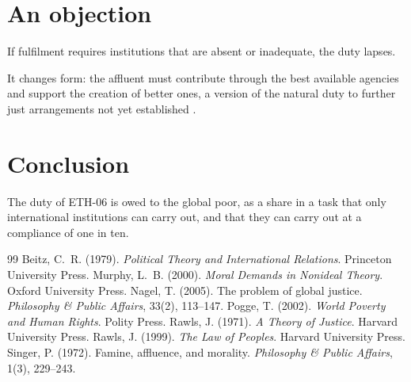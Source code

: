 \documentclass{situationist-preprint}
\begin{document}
\section{An objection}

\begin{objection}
If fulfilment requires institutions that are absent or inadequate, the duty lapses.
\end{objection}

\begin{reply}
It changes form: the affluent must contribute through the best available agencies and support the creation of better ones, a version of the natural duty to further just arrangements not yet established \citep[§19]{Rawls1971}.
\end{reply}


\section{Conclusion}

The duty of ETH-06 is owed to the global poor, as a share in a task that only international institutions can carry out, and that they can carry out at a compliance of one in ten.

\begin{thebibliography}{99}\small
{} Beitz, C.~R. (1979). \emph{Political Theory and International Relations}. Princeton University Press.
 Murphy, L.~B. (2000). \emph{Moral Demands in Nonideal Theory}. Oxford University Press.
 Nagel, T. (2005). The problem of global justice. \emph{Philosophy \& Public Affairs}, 33(2), 113--147.
 Pogge, T. (2002). \emph{World Poverty and Human Rights}. Polity Press.
 Rawls, J. (1971). \emph{A Theory of Justice}. Harvard University Press.
 Rawls, J. (1999). \emph{The Law of Peoples}. Harvard University Press.
 Singer, P. (1972). Famine, affluence, and morality. \emph{Philosophy \& Public Affairs}, 1(3), 229--243.
\end{thebibliography}
\end{document}
